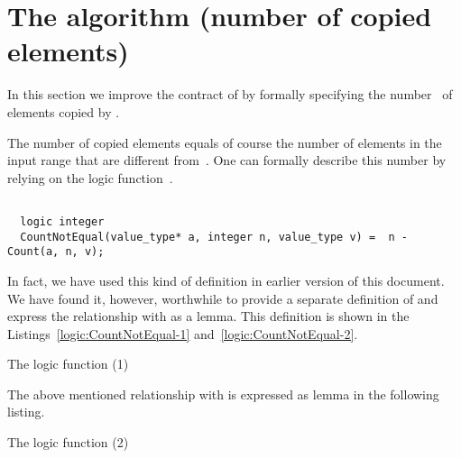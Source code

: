 
\section{The \removecopyii algorithm (number of copied elements)}
\label{sec:removecopyii}

In this section we improve the contract of 
by formally specifying the number~\inl{\\result} of elements copied by \removecopy.

The number of copied elements equals of course the number of elements
in the input range  that are different from~.
One can formally describe this number by relying on the logic function~.

\begin{lstlisting}[style=acsl-block]

  logic integer
  CountNotEqual(value_type* a, integer n, value_type v) =  n - Count(a, n, v);
\end{lstlisting}

In fact, we have used this kind of definition in earlier version of this document.
We have found it, however, worthwhile to provide a separate definition of \CountNotEqual
and express the relationship with \Count as a lemma.
This definition is shown in the Listings~\ref{logic:CountNotEqual-1}
and~\ref{logic:CountNotEqual-2}.

\begin{logic}[hbt]
\begin{minipage}{\textwidth}

\end{minipage}
\caption{ The logic function \CountNotEqual (1)}


\end{logic}


\clearpage

The  above mentioned relationship with  is expressed as
lemma  in the following listing.

\begin{logic}[hbt]
\begin{minipage}{\textwidth}

\end{minipage}
\caption{ The logic function \CountNotEqual (2)}
\end{logic}

